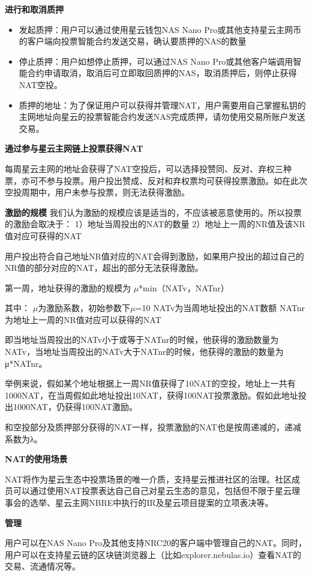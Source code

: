 \begin{enumerate}
	\textbf{进行和取消质押}

	\begin{itemize}
		\item 发起质押：用户可以通过使用星云钱包NAS Nano Pro或其他支持星云主网币的客户端向投票智能合约发送交易，确认要质押的NAS的数量
		\item 停止质押：用户如想停止质押，可以通过NAS Nano Pro或其他客户端调用智能合约申请取消，取消后可立即取回质押的NAS，取消质押后，则停止获得NAT空投。
		\item 质押的地址：为了保证用户可以获得并管理NAT，用户需要用自己掌握私钥的主网地址向星云的投票智能合约发送NAS完成质押，请勿使用交易所账户发送交易。
	\end{itemize}

\textbf{通过参与星云主网链上投票获得NAT}

	每周星云主网的地址会获得了NAT空投后，可以选择投赞同、反对、弃权三种票，亦可不参与投票。用户投出赞成、反对和弃权票均可获得投票激励。如在此次空投周期中，用户未参与投票，则无法获得激励。

	\textbf{激励的规模}
		我们认为激励的规模应该是适当的，不应该被恶意使用的。所以投票的激励会取决于：
		1）地址当周投出的NAT的数量
		2）地址上一周的NR值及该NR值对应可获得的NAT
		
		用户投出符合自己地址NR值对应的NAT会得到激励，如果用户投出的超过自己的NR值的部分对应的NAT，超出的部分无法获得激励。
		
		第一周，地址获得的激励的规模为 $μ$*min（NATv，NATnr）

		其中：
		$μ$为激励系数，初始参数下$μ$=10
		NATv为当周地址投出的NAT数额
		NATnr为地址上一周的NR值对应可以获得的NAT

		即当地址当周投出的NATv小于或等于NATnr的时候，他获得的激励数量为NATv，当地址当周投出的NATv大于NATnr的时候，他获得的激励的数量为 μ*NATnr。

		举例来说，假如某个地址根据上一周NR值获得了10NAT的空投，地址上一共有1000NAT，在当周假如此地址投出10NAT，获得100NAT投票激励。假如此地址投出1000NAT，仍获得100NAT激励。

		和空投部分及质押部分获得的NAT一样，投票激励的NAT也是按周递减的，递减系数为λ。

\textbf{NAT的使用场景}

NAT将作为星云生态中投票场景的唯一介质，支持星云推进社区的治理。社区成员可以通过使用NAT投票表达自己自己对星云生态的意见，包括但不限于星云理事会的选举、星云主网NBRE中执行的IR及星云项目提案的立项表决等。

\textbf{管理}

用户可以在NAS Nano Pro及其他支持NRC20的客户端中管理自己的NAT。同时，用户可以在支持星云链的区块链浏览器上（比如explorer.nebulas.io）查看NAT的交易、流通情况等。


\end{enumerate}
